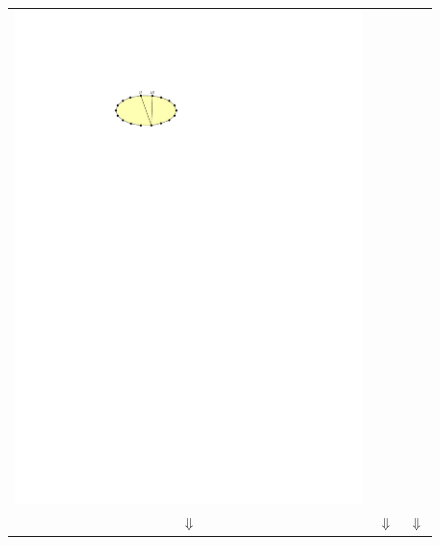 \documentclass[a4paper,UKenglish,cleveref, autoref, thm-restate]{lipics-v2021}
\begin{document}
\begin{figure}
\begin{tabular}{ccc}
    \includegraphics[page=5]{figs/minimal} \\
    $\Downarrow$ & $\Downarrow$ & $\Downarrow$ \\

\end{tabular}
\end{figure}
\end{document}
